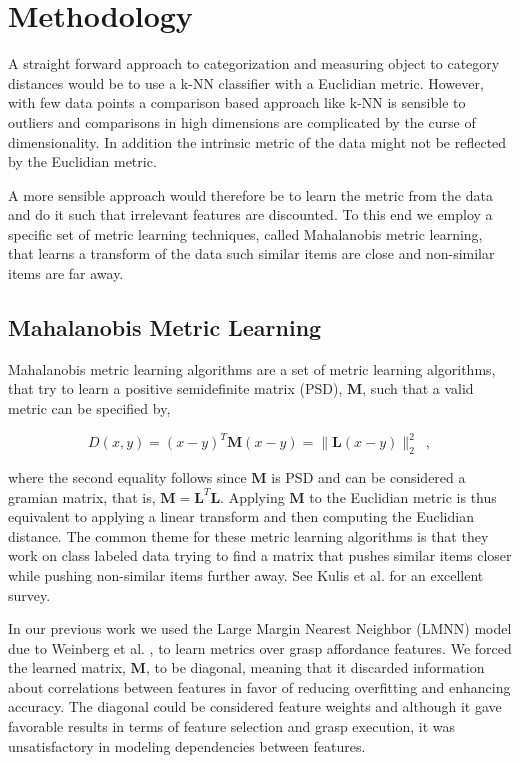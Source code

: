 \section{Methodology}\label{methodology}

A straight forward approach to categorization and measuring object to
category distances would be to use a k-NN classifier with a Euclidian
metric. However, with few data points a comparison based approach like
k-NN is sensible to outliers and comparisons in high dimensions are
complicated by the curse of dimensionality. In addition the intrinsic
metric of the data might not be reflected by the Euclidian metric.

A more sensible approach would therefore be to learn the metric from the
data and do it such that irrelevant features are discounted. To this end
we employ a specific set of metric learning techniques, called
Mahalanobis metric learning, that learns a transform of the data such
similar items are close and non-similar items are far away.



\subsection{Mahalanobis Metric
Learning}\label{mahalanobis-metric-learning}

Mahalanobis metric learning algorithms are a set of metric learning
algorithms, that try to learn a positive semidefinite matrix (PSD),
\(\mathbf{M}\), such that a valid metric can be specified by,

\begin{equation}
    D(x,y) = (x-y)^{T} \mathbf{M} (x-y) = \parallel \mathbf{L}(x-y) \parallel^{2}_{2} \enspace ,
\end{equation}

where the second equality follows since \(\mathbf{M}\) is PSD and can be
considered a gramian matrix, that is,
\(\mathbf{M}=\mathbf{L}^{T}\mathbf{L}\). Applying \(\mathbf{M}\) to the
Euclidian metric is thus equivalent to applying a linear transform and
then computing the Euclidian distance. The common theme for these metric
learning algorithms is that they work on class labeled data trying to
find a matrix that pushes similar items closer while pushing non-similar
items further away. See Kulis et al. \cite{Kulis:2012tx} for an
excellent survey.

In our previous work \cite{Hjelm:2015hw} we used the Large Margin
Nearest Neighbor (LMNN) model due to Weinberg et al.
\cite{Weinberger:2009to}, to learn metrics over grasp affordance
features. We forced the learned matrix, \(\mathbf{M}\), to be diagonal,
meaning that it discarded information about correlations between
features in favor of reducing overfitting and enhancing accuracy. The
diagonal could be considered feature weights and although it gave
favorable results in terms of feature selection and grasp execution, it
was unsatisfactory in modeling dependencies between features.

